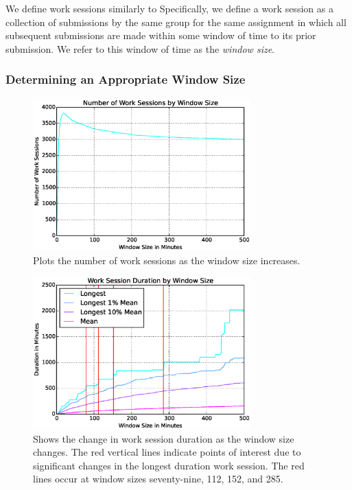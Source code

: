 We define work sessions similarly to \spacco[.]{} Specifically, we define a
work session as a collection of submissions by the same group for the same
assignment in which all subsequent submissions are made within some window of
time to its prior submission. We refer to this window of time as the
\emph{window size}.

\subsubsection{Determining an Appropriate Window Size}

\begin{figure}[!t]
\centering
\includegraphics[width=3.3in]{graphs/Number_of_Work_Sessions_by_Window_Size.eps}
\caption{Plots the number of work sessions as the window size increases.}
\end{figure}

\begin{figure}[!t]
\centering
\includegraphics[width=3.3in]{graphs/Work_Session_Duration_by_Window_Size.eps}
\caption{Shows the change in work session duration as the window size
  changes. The red vertical lines indicate points of interest due to
  significant changes in the longest duration work session. The red lines occur
  at window sizes seventy-nine, 112, 152, and 285.}
\end{figure}

